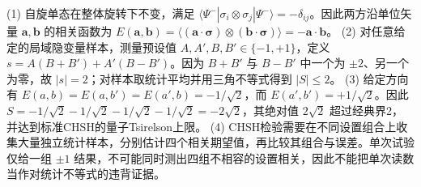 (1) 自旋单态在整体旋转下不变，满足 \(\langle\Psi^-|\sigma_i\otimes\sigma_j|\Psi^-\rangle=-\delta_{ij}\)。因此两方沿单位矢量 \(\mathbf a,\mathbf b\) 的相关函数为 \(E(\mathbf a,\mathbf b)=\langle(\mathbf a\cdot\boldsymbol\sigma)\otimes(\mathbf b\cdot\boldsymbol\sigma)\rangle=-\mathbf a\cdot\mathbf b\)。
(2) 对任意给定的局域隐变量样本，测量预设值 \(A,A',B,B'\in\{-1,+1\}\)，定义 \(s=A(B+B')+A'(B-B')\)。因为 \(B+B'\) 与 \(B-B'\) 中一个为 \(\pm2\)、另一个为零，故 \(|s|=2\)；对样本取统计平均并用三角不等式得到 \(|S|\le2\)。
(3) 给定方向有 \(E(a,b)=E(a,b')=E(a',b)=-1/\sqrt2\)，而 \(E(a',b')=+1/\sqrt2\)。因此 \(S=-1/\sqrt2-1/\sqrt2-1/\sqrt2-1/\sqrt2=-2\sqrt2\)，其绝对值 \(2\sqrt2\) 超过经典界2，并达到标准CHSH的量子Tsirelson上限。
(4) CHSH检验需要在不同设置组合上收集大量独立统计样本，分别估计四个相关期望值，再比较其组合与误差。单次试验仅给一组 \(\pm1\) 结果，不可能同时测出四组不相容的设置相关，因此不能把单次读数当作对统计不等式的违背证据。

